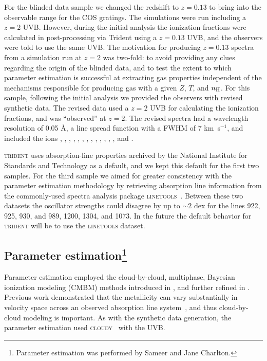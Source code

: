 \documentclass[fleqn,usenatbib]{mnras}
\def\kms{\hbox{km~s$^{-1}$}}
\begin{document}
For the blinded data sample we changed the redshift to $z=0.13$ to bring  into the observable range for the COS gratings.
The simulations were run including a $z=2$ UVB.
However, during the initial analysis the ionization fractions were calculated in post-processing via Trident using a $z=0.13$ \cite{haardt2012RADIATIVE} UVB, and the observers were told to use the same UVB.
The motivation for producing $z=0.13$ spectra from a simulation run at $z=2$ was two-fold:
to avoid providing any clues regarding the origin of the blinded data,
and to test the extent to which parameter estimation is successful at extracting gas properties independent of the mechanisms responsible for producing gas with a given $Z$, $T$, and $n_{\rm H}$.
For this sample, following the initial analysis we provided the observers with revised synthetic data.
The revised data used a $z=2$ UVB for calculating the ionization fractions, and was ``observed'' at $z=2$.
The revised spectra had a wavelength resolution of 0.05 \AA, a line spread function with a FWHM of 7 {\kms}, and included the ions , , , , , , , , , , , , , and .

\textsc{trident} uses absorption-line properties archived by the National Institute for Standards and Technology as a default, and we kept this default for the first two samples.
For the third sample we aimed for greater consistency with the parameter estimation methodology by retrieving absorption line information from the commonly-used spectra analysis package \textsc{linetools}~\citep{prochaska2016Linetools}.
Between these two datasets the oscillator strengths could disagree by up to $\sim 2$ dex for the lines  922, 925, 930, and 989,  1200,  1304, and  1073.
In the future the default behavior for \textsc{trident} will be to use the \textsc{linetools} dataset.

\subsection[Parameter estimation]{Parameter estimation\footnote{
 Parameter estimation was performed by Sameer and Jane Charlton.}}
\label{s:  parameter estimation}

 Parameter estimation employed the cloud-by-cloud, multiphase, Bayesian ionization modeling (CMBM) methods introduced in \cite{sameer2021Cloudbycloud}, and further refined in \cite{sameer2022Probing}.
Previous work demonstrated that the metallicity can vary substantially in velocity space across an observed absorption line system~\citep{Prochter2010,lehner2019COS,Wotta2019,Zahedy2021,lehner2022Intermediate}, and thus cloud-by-cloud modeling is important.
As with the synthetic data generation, the parameter estimation used \textsc{cloudy}~\citep{ferland20132013} with the \cite{haardt2012RADIATIVE} UVB.
\end{document}
